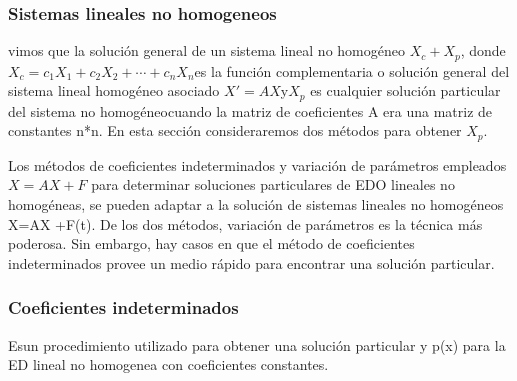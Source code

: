 \documentclass[11.5pt]{article}
\begin{document}
\subsubsection{Sistemas lineales no homogeneos}
vimos que la solución general de un sistema lineal no homogéneo $X_c+X_p$, donde $X_c =c_1X_1+c_2X_2+\cdots+c_nX_n$es la función complementaria o solución general del sistema lineal homogéneo asociado $X'=AX $y$ X_p $ es cualquier solución particular del sistema no homogéneocuando la matriz de coeficientes A era una matriz de constantes n*n. En esta sección consideraremos dos métodos para obtener $X_p$.

Los métodos de coeficientes indeterminados y variación de parámetros empleados  $X =AX + F$ para determinar soluciones particulares de EDO lineales no homogéneas, se pueden adaptar
a la solución de sistemas lineales no homogéneos X=AX +F(t). De los dos métodos, variación
de parámetros es la técnica más poderosa. Sin embargo, hay casos en que el método de coeficientes
indeterminados provee un medio rápido para encontrar una solución particular.
\subsubsection{Coeficientes indeterminados}
Esun procedimiento utilizado para obtener una solución particular y p(x) para la ED lineal no homogenea con coeficientes constantes.
\end{document}
